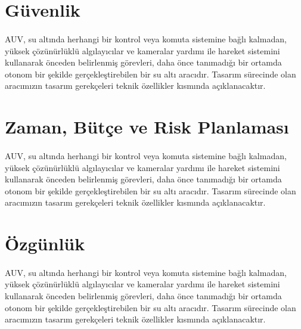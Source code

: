 \documentclass[12pt]{article}
\begin{document}
\section{Güvenlik}

\begin{justify}
\paragraph{} AUV, su altında herhangi bir kontrol veya komuta sistemine bağlı kalmadan, yüksek çözünürlüklü algılayıcılar ve kameralar yardımı ile hareket sistemini kullanarak önceden belirlenmiş görevleri, daha önce tanımadığı bir ortamda otonom bir şekilde gerçekleştirebilen bir su altı aracıdır. Tasarım sürecinde olan aracımızın tasarım gerekçeleri teknik özellikler kısmında açıklanacaktır.
\end{justify}

\section{Zaman, Bütçe ve Risk Planlaması}

\begin{justify}
\paragraph{} AUV, su altında herhangi bir kontrol veya komuta sistemine bağlı kalmadan, yüksek çözünürlüklü algılayıcılar ve kameralar yardımı ile hareket sistemini kullanarak önceden belirlenmiş görevleri, daha önce tanımadığı bir ortamda otonom bir şekilde gerçekleştirebilen bir su altı aracıdır. Tasarım sürecinde olan aracımızın tasarım gerekçeleri teknik özellikler kısmında açıklanacaktır.
\end{justify}

\section{Özgünlük}

\begin{justify}
\paragraph{} AUV, su altında herhangi bir kontrol veya komuta sistemine bağlı kalmadan, yüksek çözünürlüklü algılayıcılar ve kameralar yardımı ile hareket sistemini kullanarak önceden belirlenmiş görevleri, daha önce tanımadığı bir ortamda otonom bir şekilde gerçekleştirebilen bir su altı aracıdır. Tasarım sürecinde olan aracımızın tasarım gerekçeleri teknik özellikler kısmında açıklanacaktır.
\end{justify}
\end{document}
